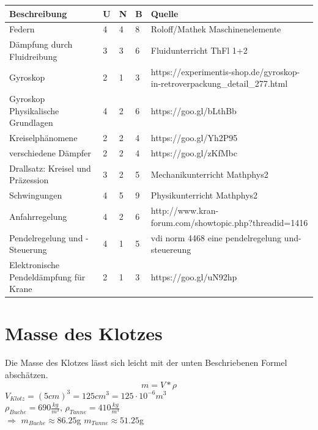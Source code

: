 \documentclass[a4paper]{report}
\begin{document}
\vspace{1em}
\noindent
\begin{tabular}{|p{}|p{}|p{}|p{}|p{}|}
	\hline
	\textbf{Beschreibung} & \textbf{U} & \textbf{N} & \textbf{B} & \textbf{Quelle} \\
	\hline
	Federn &4 &4 &8 & Roloff/Mathek Maschinenelemente \\
	\hline
	Dämpfung durch Fluidreibung &3 &3 &6 & Fluidunterricht ThFl 1+2 \\
	\hline
	Gyroskop &2 &1 &3 & https://experimentis-shop.de/gyroskop-in-retroverpackung\_detail\_277.html \\
	\hline
	Gyroskop Physikalische Grundlagen &4 &2 &6 & https://goo.gl/bLthBb \\
	\hline
	Kreiselphänomene &2 &2 &4 & https://goo.gl/Yh2P95 \\
	\hline
	verschiedene Dämpfer &2 &2 &4 & https://goo.gl/zKfMbc \\
	\hline
	Drallsatz: Kreisel und Präzession &3 &2 &5 & Mechanikunterricht Mathphys2 \\
	\hline
	Schwingungen &4 &5 &9 & Physikunterricht Mathphys2 \\
	\hline
	Anfahrregelung &4 &2 &6 & http://www.kran-forum.com/showtopic.php?threadid=1416 \\
	\hline
	Pendelregelung und -Steuerung &4 &1 &5 & vdi norm 4468 eine pendelregelung und- steuereung \\
	\hline
	Elektronische Pendeldämpfung für Krane &2 &1 &3 & https://goo.gl/uN92hp\\
	\hline
\end{tabular}

\section{Masse des Klotzes}
\label{sec:RechKlotzMasse}
Die Masse des Klotzes lässt sich leicht mit der unten Beschriebenen Formel abschätzen.  \\
\begin{displaymath}
	m=V*\rho
\end{displaymath}
$V_{Klotz}=(5cm)^3=125cm^3=125\cdot10^{-6} m^3$ \\
$\rho_{Buche}=690\frac{kg}{m^3}$, $\rho_{Tanne}= 410\frac{kg}{m^3}$ \\
$\Rightarrow$ $m_{Buche} \approx 86.25$g \hspace*{10mm} $m_{Tanne} \approx 51.25$g
\end{document}
